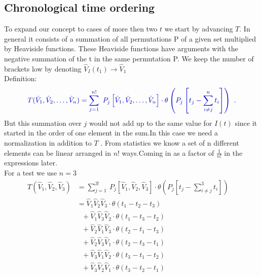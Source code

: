 \documentclass[12pt, titlepage]{article}
\begin{document}
\begin{subappendices}
\subsection{Chronological time ordering}\label{chronological_time}

To expand our concept to cases of more then  two $  t $ we start by advancing $ T $.
In general it consists of a summation of all permutations P of a given set multiplied by Heaviside functions. These Heaviside functions have arguments with the negative summation of the t in the same permutation P.
We keep the number of brackets low by denoting $ \hat{V}_{I}(t_{1}) \rightarrow \hat{V}_{1} $ \\
Definition:
\begin{equation}\textcolor[RGB]{0,0,204}{
T(\hat{V}_1, \hat{V}_2,\ldots,\hat{V}_n)=
\sum_{j=1}^{n!}\ P_{j}
\left[
\hat{V}_1, \hat{V}_2,\ldots,\hat{V}_n
 \right]  
\cdot
\theta \left(P_{j}\left[t_{j} -\sum_{i\neq j}^{n} t_{i}\right]\right)\ .
}
\end{equation}
But this summation over $ j $ would not add up to the same value for $ I(t) $ since it started in the order of one element in the sum.In this case we need a normalization in addition to $ T $ . From statistics we know a set of n different elements can be linear arranged in $ n! $ ways.Coming in as a factor of $ \frac{1}{n!} $ in the expressions later.
\\
For a test we use $ n=3 $
\begin{subequations}
\begin{align}
T(\hat{V}_1, \hat{V}_2,\hat{V}_3)
&=
\sum_{j=1}^{3!}\ P_{j}
\left[
\hat{V}_1, \hat{V}_2,\hat{V}_3
 \right]  
\cdot
\theta \left(P_{j}\left[t_{j} -\sum_{i\neq j}^{3} t_{i}\right]\right)\
&\\
&=\hat{V}_{1}\hat{V}_{2}\hat{V}_{3}\cdot \theta(t_{1}-t_{2}-t_{3})
	&\\
	& \ \ \ +\hat{V}_{1}\hat{V}_{3}\hat{V}_{2} \cdot \theta(t_{1}-t_{3}-t_{2})
	&\\
	& \ \ \ +\hat{V}_{2}\hat{V}_{1}\hat{V}_{3} \cdot \theta(t_{2}-t_{1}-t_{3})
	&\\
	& \ \ \ +\hat{V}_{2}\hat{V}_{3}\hat{V}_{1} \cdot \theta(t_{2}-t_{3}-t_{1})
	&\\
	& \ \ \ +\hat{V}_{3}\hat{V}_{1}\hat{V}_{2} \cdot \theta(t_{3}-t_{1}-t_{2})
	&\\
	& \ \ \ +\hat{V}_{3}\hat{V}_{2}\hat{V}_{1} \cdot \theta(t_{3}-t_{2}-t_{1})
\end{align}

\end{subequations}
\end{subappendices}
\end{document}
